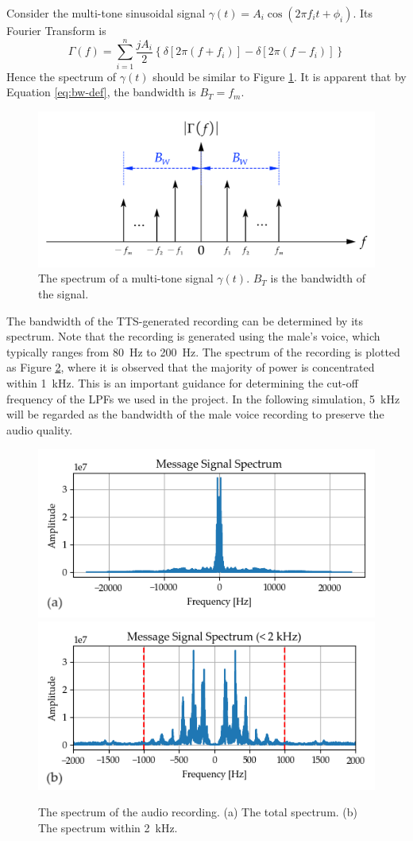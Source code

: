 \documentclass[../ECE459FinalProjectReport.tex]{subfiles}
\begin{document}
Consider the multi-tone sinusoidal signal $\gamma \left(t\right) = A_i\cos\left(2\pi f_i t + \phi_i\right)$. Its Fourier Transform is
\begin{equation}
    \Gamma \left(f\right) = \sum_{i=1}^{n} \frac{jA_i}{2}\left\lbrace \delta\left[ 2\pi \left(f + f_i \right)\right] - \delta\left[ 2\pi \left(f - f_i \right)\right]\right\rbrace
\end{equation}
Hence the spectrum of $\gamma\left(t\right)$ should be similar to Figure \ref{fig:multi-tone-spectrum}. It is apparent that by Equation \eqref{eq:bw-def}, the bandwidth is $B_T = f_m$.
\begin{figure}[tb]
    \centering
    \includegraphics[scale=.35]{plots/multi-tone_spectrum.pdf}
    \caption{The spectrum of a multi-tone signal $\gamma\left(t\right)$. $B_T$ is the bandwidth of the signal.}
    \label{fig:multi-tone-spectrum}
\end{figure}

The bandwidth of the TTS-generated recording can be determined by its spectrum. Note that the recording is generated using the male's voice, which typically ranges from \SI{80}{Hz} to \SI{200}{\Hz}. The spectrum of the recording is plotted as Figure \ref{fig:audio-spectrum}, where it is observed that the majority of power is concentrated within \SI{1}{kHz}. This is an important guidance for determining the cut-off frequency of the LPFs we used in the project. In the following simulation, \SI{5}{kHz} will be regarded as the bandwidth of the male voice recording to preserve the audio quality.
\begin{figure}[tb]
    \centering
    \includegraphics[width=0.49\linewidth]{plots/audio_spectrum.png}
    \includegraphics[width=0.49\linewidth]{plots/audio_spectrum_2khz.png}
    \caption{The spectrum of the audio recording. (a) The total spectrum. (b) The spectrum within \SI{2}{kHz}.}
    \label{fig:audio-spectrum}
\end{figure}
\end{document}
